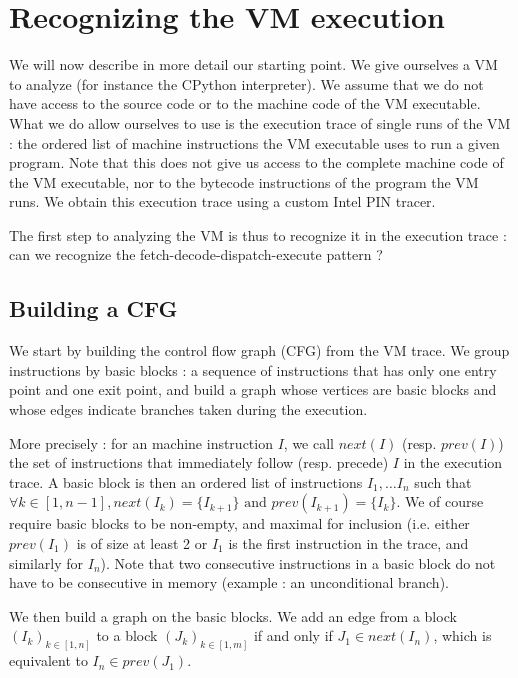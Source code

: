 \documentclass[french]{article}
\begin{document}
\section{Recognizing the VM execution}

We will now describe in more detail our starting point. We give ourselves a VM to analyze (for instance the CPython interpreter). We assume that we do not have access to the source code or to the machine code of the VM executable. What we do allow ourselves to use is the execution trace of single runs of the VM : the ordered list of machine instructions the VM executable uses to run a given program. Note that this does not give us access to the complete machine code of the VM executable, nor to the bytecode instructions of the program the VM runs. We obtain this execution trace using a custom Intel PIN tracer.

The first step to analyzing the VM is thus to recognize it in the execution trace : can we recognize the fetch-decode-dispatch-execute pattern ?

\subsection{Building a CFG}

We start by building the control flow graph (CFG) from the VM trace. We group instructions by basic blocks : a sequence of instructions that has only one entry point and one exit point, and build a graph whose vertices are basic blocks and whose edges indicate branches taken during the execution.

More precisely : for an machine instruction $I$, we call $next(I)$ (resp. $prev(I)$) the set of instructions that immediately follow (resp. precede) $I$ in the execution trace. A basic block is then an ordered list of instructions $I_1, \dots I_n$ such that $\forall k \in [1, n-1], next(I_k) = \{I_{k+1}\} \textrm{ and } prev(I_{k+1}) = \{I_k\}$. We of course require basic blocks to be non-empty, and maximal for inclusion (i.e. either $prev(I_1)$ is of size at least 2 or $I_1$ is the first instruction in the trace, and similarly for $I_n$). Note that two consecutive instructions in a basic block do not have to be consecutive in memory (example : an unconditional branch).

We then build a graph on the basic blocks. We add an edge from a block $(I_k)_{k \in [1,n]}$ to a block $(J_k)_{k \in [1, m]}$ if and only if $J_1 \in next(I_n)$, which is equivalent to $I_n \in prev(J_1)$.
\end{document}
